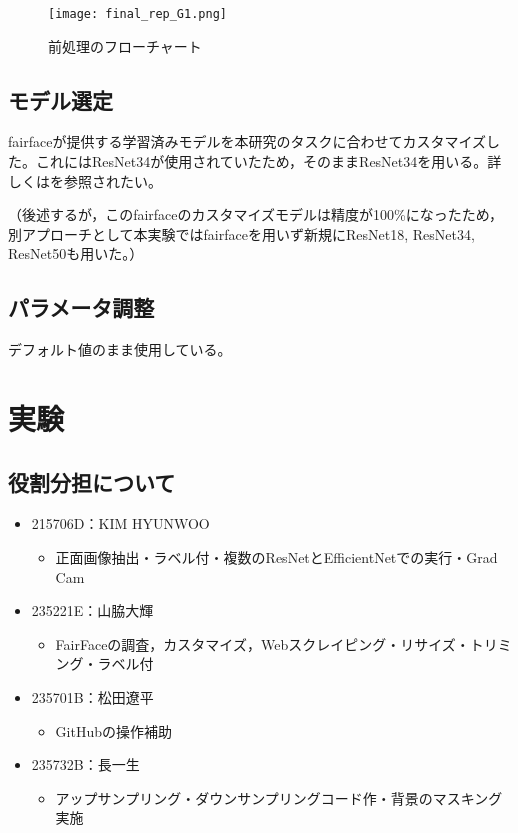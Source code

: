 \documentclass[a4paper,11pt,titlepage]{jsarticle}
\begin{document}
\begin{figure}[H]
    \centering
    \texttt{[image: final\_rep\_G1.png]}
    \caption{前処理のフローチャート}
    \label{fig:csv}
\end{figure}


\subsection{モデル選定}
fairfaceが提供する学習済みモデルを本研究のタスクに合わせてカスタマイズした。これにはResNet34が使用されていたため，そのままResNet34を用いる。詳しくは\cite{karkkainenfairface}を参照されたい。\par
（後述するが，このfairfaceのカスタマイズモデルは精度が100\%になったため，別アプローチとして本実験ではfairfaceを用いず新規にResNet18, ResNet34, ResNet50も用いた。）


\subsection{パラメータ調整}
デフォルト値のまま使用している。

\section{実験}

\subsection{役割分担について}
\begin{itemize}
    \item 215706D：KIM HYUNWOO
        \begin{itemize}
            \item 正面画像抽出・ラベル付・複数のResNetとEfficientNetでの実行・Grad Cam
        \end{itemize}
    \item 235221E：山脇大輝
        \begin{itemize}
            \item FairFaceの調査，カスタマイズ，Webスクレイピング・リサイズ・トリミング・ラベル付
        \end{itemize}
    \item 235701B：松田遼平
        \begin{itemize}
            \item GitHubの操作補助
        \end{itemize}
    \item 235732B：長一生
        \begin{itemize}
            \item アップサンプリング・ダウンサンプリングコード作・背景のマスキング実施
        \end{itemize}
\end{itemize}
\end{document}

